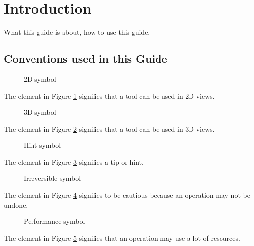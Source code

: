 \section{Introduction}
What this guide is about, how to use this guide.

\subsection{Conventions used in this Guide}
\begin{figure}[h!] %
	\centering
	
	\caption{2D symbol}\label{fig:2d_icon}
\end{figure}
\noindent
The element in Figure \ref{fig:2d_icon} signifies that a tool can be used in 2D views.\newline

\begin{figure}[h!] %
	\centering
	
	\caption{3D symbol}\label{fig:3d_icon}
\end{figure}
\noindent
The element in Figure \ref{fig:3d_icon} signifies that a tool can be used in 3D views.\newline

\begin{figure}[h!] %
	\centering
	
	\caption{Hint symbol}\label{fig:hint_icon}
\end{figure}
\noindent
The element in Figure \ref{fig:hint_icon} signifies a tip or hint.\newline

\begin{figure}[h!] %
	\centering
	
	\caption{Irreversible symbol}\label{fig:noundo_icon}
\end{figure}
\noindent
The element in Figure \ref{fig:noundo_icon} signifies to be cautious because an operation may not be undone.\pagebreak

\begin{figure}[h!] %
	\centering
	
	\caption{Performance symbol}\label{fig:performance_icon}
\end{figure}
\noindent
The element in Figure \ref{fig:performance_icon} signifies that an operation may use a lot of resources.\newline

